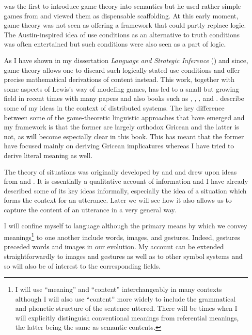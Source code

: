 \citet{lewis:c} was the first to introduce game theory into semantics but he used rather simple games from \citet{schelling:sc} and viewed them as dispensable scaffolding. At this early moment, game theory was not seen as offering a framework that could partly replace logic. The Austin-inspired idea of use conditions as an alternative to truth conditions was often entertained but such conditions were also seen as a part of logic.

As I have shown in my dissertation \emph{Language and Strategic Inference} (\citeyear{parikh:diss}) and since, game theory allows one to discard such logically stated use conditions and offer precise mathematical derivations of content instead. This work, together with some aspects of Lewis's way of modeling games, has led to a small but growing field in recent times with many papers and also books such as \citet{benz:gtp}, \citet{pietarinen:gtlm}, \citet{clark:mg}, and \citet{benz:lge}. \citet[Chapter~8]{slb:ms} describe some of my ideas in the context of distributed systems. The key difference between some of the game-theoretic linguistic approaches that have emerged and my framework is that the former are largely orthodox Gricean and the latter is not, as will become especially clear in this book. This has meant that the former have focused mainly on deriving Gricean implicatures whereas I have tried to derive literal meaning as well.  

The theory of situations was originally developed by \citet{bp:sa} and \citet{b:sl} and drew upon ideas from \citet{shannon:mtc} and \citet{austin:htt}. It is essentially a qualitative account of information and I have already described some of its key ideas informally, especially the idea of a situation which forms the context for an utterance. Later we will see how it also allows us to capture the content of an utterance in a very general way.\pagebreak


I will confine myself to language although the primary means by which we convey meanings{\footnote{I will use ``meaning'' and ``content'' interchangeably in many contexts although I will also use ``content'' more widely to include the grammatical and phonetic structure of the sentence uttered. There will be times when I will explicitly distinguish conventional meanings from referential meanings, the latter being the same as semantic contents.}} to one another include words, images, and gestures. Indeed, gestures preceded words and images in our evolution. My account can be extended  straightforwardly to images and gestures as well as to other symbol systems and so will also be of interest to the corresponding fields.

